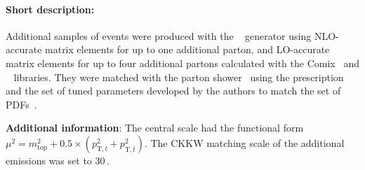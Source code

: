 \paragraph{Short description:}

Additional samples of \ttbar events were produced with the
\SHERPA[2.2.1]~\cite{Bothmann:2019yzt} generator using NLO-accurate
matrix elements for up to one additional parton, and LO-accurate
matrix elements for up to four additional partons calculated with the
Comix~\cite{Gleisberg:2008fv} and
\OPENLOOPS~\cite{Buccioni:2019sur,Cascioli:2011va,Denner:2016kdg} libraries. They were
matched with the \SHERPA parton shower~\cite{Schumann:2007mg} using
the \MEPSatNLO
prescription~\cite{Hoeche:2011fd,Hoeche:2012yf,Catani:2001cc,Hoeche:2009rj}
and the set of tuned parameters developed by the \SHERPA authors
to match the \NNPDF[3.0nnlo] set of PDFs~\cite{Ball:2014uwa}.

\textbf{Additional information}: The central scale had the functional
form $\mu^{2} = m_{\text{top}}^{2} + 0.5\times(p_{\mathrm{T},t}^{2} +
p_{\mathrm{T},\bar{t}}^{2})$. The CKKW matching scale of the
additional emissions was set to 30\,\GeV.
